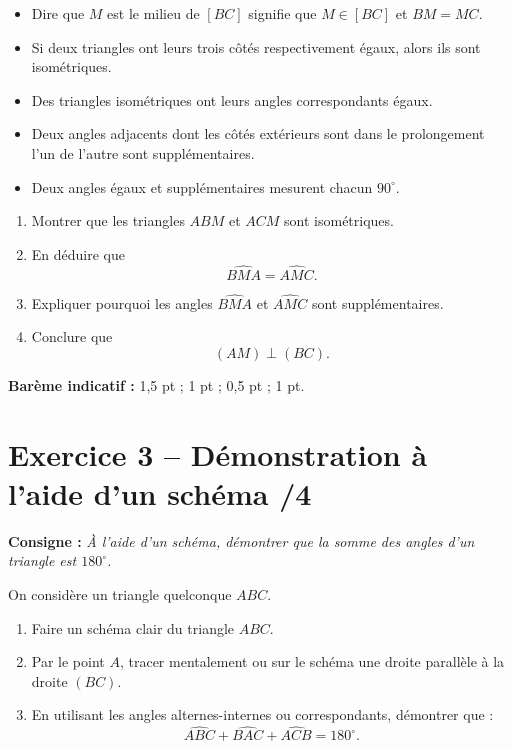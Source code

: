\documentclass[11pt,a4paper]{article}
\begin{document}
\begin{tcolorbox}[title=Rappels utiles]
\begin{itemize}[leftmargin=1.2cm]
    \item Dire que \(M\) est le milieu de \([BC]\) signifie que \(M \in [BC]\) et \(BM=MC\).
    \item Si deux triangles ont leurs trois côtés respectivement égaux, alors ils sont isométriques.
    \item Des triangles isométriques ont leurs angles correspondants égaux.
    \item Deux angles adjacents dont les côtés extérieurs sont dans le prolongement l'un de l'autre sont supplémentaires.
    \item Deux angles égaux et supplémentaires mesurent chacun \(90^\circ\).
\end{itemize}
\end{tcolorbox}

\begin{enumerate}[label=\textbf{\arabic*.}, leftmargin=1.2cm]
    \item Montrer que les triangles \(ABM\) et \(ACM\) sont isométriques.
    \item En déduire que
    \[
    \widehat{BMA}=\widehat{AMC}.
    \]
    \item Expliquer pourquoi les angles \(\widehat{BMA}\) et \(\widehat{AMC}\) sont supplémentaires.
    \item Conclure que
    \[
    (AM)\perp(BC).
    \]
\end{enumerate}

\vspace{0.6em}
\textbf{Barème indicatif :} 1,5 pt ; 1 pt ; 0,5 pt ; 1 pt.

\section*{Exercice 3 -- Démonstration à l'aide d'un schéma \hfill /4}

\textbf{Consigne :} \emph{À l'aide d'un schéma, démontrer que la somme des angles d'un triangle est \(180^\circ\).}

\medskip

On considère un triangle quelconque \(ABC\).

\begin{enumerate}[label=\textbf{\arabic*.}, leftmargin=1.2cm]
    \item Faire un schéma clair du triangle \(ABC\).
    \item Par le point \(A\), tracer mentalement ou sur le schéma une droite parallèle à la droite \((BC)\).
    \item En utilisant les angles alternes-internes ou correspondants, démontrer que :
    \[
    \widehat{ABC}+\widehat{BAC}+\widehat{ACB}=180^\circ.
    \]
\end{enumerate}
\end{document}
